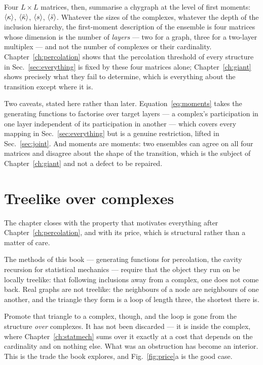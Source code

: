 Four $L\times L$ matrices, then, summarise a chygraph at the level of first
moments: $\langle \kappa \rangle$, $\langle \bar\kappa \rangle$, $\langle s \rangle$, $\langle \bar s \rangle$. Whatever the sizes of the complexes, whatever
the depth of the inclusion hierarchy, the first-moment description of the
ensemble is four matrices whose dimension is the number of \emph{layers} --- two
for a graph, three for a two-layer multiplex --- and not the number of complexes
or their cardinality. Chapter~\ref{ch:percolation} shows that the percolation
threshold of every structure in Sec.~\ref{sec:everything} is fixed by these four
matrices alone; Chapter~\ref{ch:giant} shows precisely what they fail to
determine, which is everything about the transition except where it is.

Two caveats, stated here rather than later. Equation~\eqref{eq:moments}
takes the generating functions to factorise over target layers --- a complex's
participation in one layer independent of its participation in another --- which
covers every mapping in Sec.~\ref{sec:everything} but is a genuine restriction,
lifted in Sec.~\ref{sec:joint}. And moments are moments: two ensembles can agree
on all four matrices and disagree about the shape of the transition, which is
the subject of Chapter~\ref{ch:giant} and not a defect to be repaired.

\section{Treelike over complexes}
\label{sec:treelike}

The chapter closes with the property that motivates everything after
Chapter~\ref{ch:percolation}, and with its price, which is structural rather
than a matter of care.

The methods of this book --- generating functions for percolation, the cavity
recursion for statistical mechanics --- require that the object they run on be
locally treelike: that following inclusions away from a complex, one does not
come back. Real graphs are not treelike: the neighbours of a node are neighbours
of one another, and the triangle they form is a loop of length three, the
shortest there is.

Promote that triangle to a complex, though, and the loop is gone from the
structure \emph{over} complexes. It has not been discarded --- it is inside the
complex, where Chapter~\ref{ch:statmech} sums over it exactly at a cost that
depends on the cardinality and on nothing else. What was an obstruction has
become an interior. This is the trade the book explores, and Fig.~\ref{fig:price}a
is the good case.

